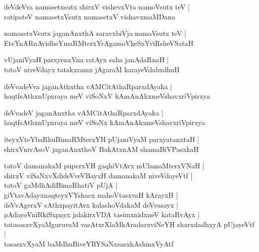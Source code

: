\documentclass[twoside,12pt,openright]{book}
\newcounter{shloka}[chapter]
\begin{document}
\begin{shloka}%
deVdeVva namasetxsutx shirxV vishevxVta namoVsutx teV |\\
ratipateV namasetxVsutx namasetxV vishavxmaMDana
\end{shloka}

\begin{shloka}%
namasetxVsutx jaganAnxthA saravxbiVja namoVsutx teV |\\
EteYnARnAvidheYmaRMterxYrAgamoVkeSxYviRsheVSataH 
\end{shloka}

\begin{shloka}%
vUjaniVyaH parxyenxVna ratAyx saha janAdaRnaH |\\
tatoV niveVdayx tatakxramx jAgaraM karayeVdabxdhuH 
\end{shloka}

\begin{shloka}%
deVvadeVva jaganAthxtha vAMCitAthaRparxdAyaka |\\
haqtfsAthxnUpxraya meV viSoNxV kAmAnAkxmeVshavxriVpirxya 
\end{shloka}

\begin{shloka}%
deVvadeV jaganAnxtha vAMCitAthaRparxdAyaka |\\
haqtfsAthxnUpxraya meV viSoNx kAmAnAkxmeVshavxriVpirxya 
\end{shloka}

\begin{shloka}%
iteyxVteYbaRhuBimaRMterxYH pUjaniVyaM parxyatanxtaH |\\
shirxVnivAsoV jaganAnxthoV BakAtxnAM shamaBiVPasxkaH 
\end{shloka}

\begin{shloka}%
tatoV damanakaM puperxYH gaqhiVtAvx mUlamaMterxVNaH |\\
shirxV viSaNxvXdideVveVBayxH damanakaM niveVdayeVtf |\\
tatoV gaMdhAdiBimaRhatiV pUjA |\\
giVtavAdayxnaqteyxVYshacx mahoVtasxvaH kArayxH |\\
deVvAgerxV sAthxpayitAvx kalashoVdakaM deVvasayx |\\
pAdayoVniRkiSxpayx jalakirxVDA tasimxnidxneV kataRvAyx |\\
tatasasxvXyaMguruvaM vasAtxrXlaMkAradarxviNeYH sharxdadhxyA pUjayeVtf |\\
tasasxvXyaM baMdhuBiveYRYSaNxsasxhAshinxVyAtf
\end{shloka}
\end{document}

